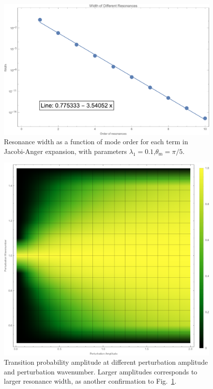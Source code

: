 \begin{figure}[!htbp]
    \centering
    \includegraphics[width=\textwidth]{chapters/assets/rabi/stimulated-probability-apmlitude-vs-k-resonance-width.pdf}
    \caption{Resonance width as a function of mode order for each term in Jacobi-Anger expansion, with parameters $\lambda_1=0.1$,$\theta_{\mathrm m}=\pi/5$.}
    \label{chap:matter-sec:single-revisted-fig:resonance-width-jacobi-anger-exp}
\end{figure}



\begin{figure}[!htbp]
    \centering
    \includegraphics[width=\textwidth]{chapters/assets/rabi/pltPertAmpPertWaveNumTransitionAmp}
    \caption{Transition probability amplitude at different perturbation amplitude and perturbation wavenumber. Larger amplitudes corresponds to larger resonance width, as another confirmation to Fig.~\ref{chap:matter-sec:single-revisted-fig:resonance-width-jacobi-anger-exp}.}
    \label{chap:matter-sec:single-revisted-fig:resonance-width-heatmap}
\end{figure}






